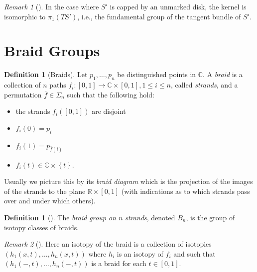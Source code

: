 \documentclass[reqno]{amsart}
\theoremstyle{definition}
\newtheorem{definition}[theorem]{Definition}
\theoremstyle{remark}
\newtheorem*{remark}{Remark}
\begin{document}
\begin{remark}[]
In the case where $S'$ is capped by an
unmarked disk, the kernel is isomorphic to 
$\pi_1 \left( TS' \right) $, i.e., the fundamental group
of the tangent bundle of $S'$.
\end{remark}



\section{Braid Groups}


\begin{definition}[Braids]
    Let $p_1, \ldots, p_n$ be distinguished points
    in $\mathbb{C}$. A \textit{braid} is a collection
    of $n$ paths $f_i \colon \left[ 0,1 \right] 
    \to \mathbb{C} \times \left[ 0,1 \right] , 1\le i \le n$,
    called \textit{strands}, and a
    permutation $\overline{f}
    \in \Sigma_n$ such that the following hold:
    \begin{itemize}
        \item the strands 
            $f_i \left( \left[ 0,1 \right]  \right) $ are
            disjoint
        \item $f_i (0) = p_i$ 
        \item $f_i (1) = p_{\overline{f}(i)}$ 
        \item $f_i (t) \in \mathbb{C} \times \left\{ t \right\} $.
    \end{itemize}
\end{definition}

Usually we picture
this by its \textit{braid diagram} which is
the projection of the images of the strands to
the plane $\mathbb{R} \times \left[ 0,1 \right] $ (with
indications as to which strands pass over and under which
others).

\begin{definition}[]
    The \textit{braid group on $n$ strands}, denoted
    $B_n$, is the group of isotopy classes of braids.
\end{definition}

\begin{remark}[]
    Here an isotopy of the braid is a collection of isotopies
    $\left( h_1(x,t), \ldots, h_n(x,t) \right) $ where
    $h_i$ is an isotopy of $f_i$ and such that
    $\left( h_1 \left( -,t \right) , \ldots,
    h_n \left( -,t \right) \right) $ is a braid
    for each $t \in \left[ 0,1 \right] $.
\end{remark}
\end{document}
